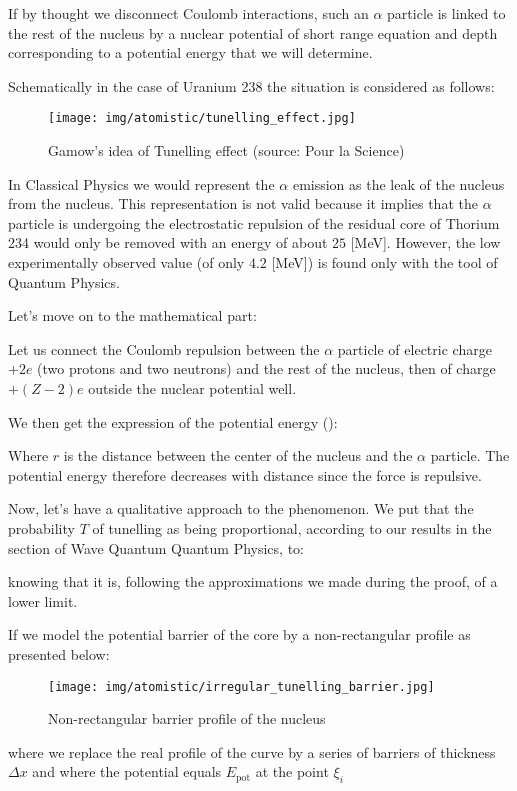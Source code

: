 	If by thought we disconnect Coulomb interactions, such an $\alpha$ particle is linked to the rest of the nucleus by a nuclear potential of short range equation and depth corresponding to a potential energy that we will determine.

	Schematically in the case of Uranium 238 the situation is considered as follows:
	\begin{figure}[H]
		\centering
		\texttt{[image: img/atomistic/tunelling\_effect.jpg]}
		\caption{Gamow's idea of Tunelling effect (source: Pour la Science)}
	\end{figure}
	In Classical Physics we would represent the $\alpha$ emission as the leak of the nucleus from the nucleus. This representation is not valid because it implies that the $\alpha$ particle is undergoing the electrostatic repulsion of the residual core of Thorium 234 would only be removed with an energy of about $25$ [MeV]. However, the low experimentally observed value (of only $4.2$ [MeV]) is found only with the tool of Quantum Physics.
	
	Let's move on to the mathematical part:
	
	Let us connect the Coulomb repulsion between the $\alpha$ particle of electric charge $+2e$ (two protons and two neutrons) and the rest of the nucleus, then of charge $+(Z-2)e$ outside the nuclear potential well.

	We then get the expression of the potential energy ():
	
	Where $r$ is the distance between the center of the nucleus and the $\alpha$ particle. The potential energy therefore decreases with distance since the force is repulsive.

	Now, let's have a qualitative approach to the phenomenon. We put that the probability $T$ of tunelling as being proportional, according to our results in the section of Wave Quantum Quantum Physics, to:

	
	knowing that it is, following the approximations we made during the proof, of a lower limit.

	If we model the potential barrier of the core by a non-rectangular profile as presented below:
	\begin{figure}[H]
		\centering
		\texttt{[image: img/atomistic/irregular\_tunelling\_barrier.jpg]}
		\caption{Non-rectangular barrier profile of the nucleus}
	\end{figure}
	where we replace the real profile of the curve by a series of barriers of thickness $\Delta x$ and where the potential equals $E_\text{pot}$ at the point $\xi_i$

